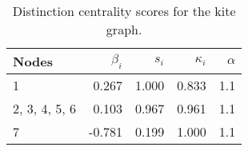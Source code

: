 \begin{table}
\centering
\caption{\label{tab:kite}Distinction centrality scores for the kite graph.}
\centering
\begin{tabular}[t]{lrrrr}
\toprule
Nodes & $\beta_i$ & $s_i$ & $\kappa_i$ & $\alpha$\\
\midrule
1 & 0.267 & 1.000 & 0.833 & 1.1\\
2, 3, 4, 5, 6 & 0.103 & 0.967 & 0.961 & 1.1\\
7 & -0.781 & 0.199 & 1.000 & 1.1\\
\bottomrule
\end{tabular}
\end{table}
